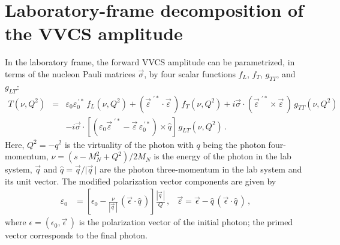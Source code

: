 \documentclass[12pt,preprint,tightenlines,
showpacs,preprintnumbers,amsmath,amssymb,
a4paper,nofootinbib]{revtex4-1}
\def\bea{\begin{eqnarray}}
\def\eea{\end{eqnarray}}
\def\eqlab#1{\label{eq:#1}}
\def\seclab#1{\label{sec:#1}}
\def\nn{\nonumber}
\begin{document}
\section{Laboratory-frame decomposition of the VVCS amplitude}
\seclab{SRVVCStensor}
In the laboratory frame, the forward VVCS amplitude can be parametrized,
in terms of the nucleon Pauli matrices $\vec{\sigma}$, by four scalar functions $f_L$, $f_T$,
$g_{TT}$, and $g_{LT}$:
\bea\label{Eq:T-Compt-definition}
T(\nu,Q^2)&=&\varepsilon_0\varepsilon_0^{\,\prime*}\,f_{L}(\nu,Q^2) +(\vec{\varepsilon}^{\,\, \prime *} \cdot \vec{\varepsilon}\,) \,f_{T}(\nu,Q^2)  +  i \vec{\sigma}\cdot (\vec{\varepsilon}^{\,\, \prime *} \times \vec{\varepsilon}\,)\, g_{TT}(\nu,Q^2) \\
&&-  i \vec{\sigma}\cdot [(\varepsilon_0\vec{\varepsilon}^{\,\, \prime *} - \vec{\varepsilon}\,\varepsilon^{\,\prime *}_0)\times \hat{q}]\, g_{LT}(\nu,Q^2)\,.\nn 
\eea
Here, $Q^2=-q^2$ is the virtuality of the photon with $q$ being the photon four-momentum, $\nu=(s-M_N^2+Q^2)/2M_N$ is the energy of the photon in the lab system, $\vec q$ and $\hat{q}=\vec{q}/\vert \vec{q}\, \vert$ are the photon three-momentum in the lab system and its unit vector. The modified polarization vector components are given by
\begin{align}
\varepsilon_0&=\left[\epsilon_0-\frac{\nu}{\left|\vec q\,\right|}\, (\vec\epsilon\cdot\hat q\,)\right]\frac{\left|\vec q\,\right|}{Q}\,,
&\vec\varepsilon = \vec\epsilon-\hat q\,(\vec\epsilon\cdot\hat q\,)\,,\eqlab{modified_polarization_vectors}
\end{align}
 where $\epsilon=(\epsilon_0,\vec\epsilon\,)$ is the polarization vector of the initial photon; the primed vector corresponds to the final photon.
\end{document}
